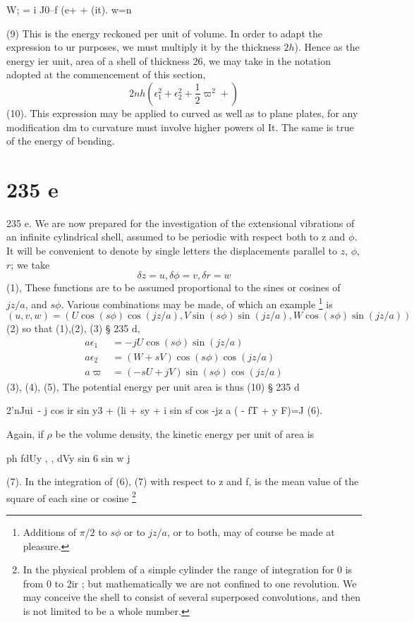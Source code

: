 W; = i J0--f (e+  + (it).  w=n

(9) This is the energy reckoned per unit of volume. In order to
adapt the expression to ur purposes, we must multiply it by the thickness
\(2h\)). Hence as the energy ier unit, area of a shell of thickness 26, we may
take in the notation adopted at the commencement of this section,
\[
 2nh \left( \epsilon_1^2 +\epsilon_2^2 + \frac{1}{2} \varpi^2 + \right)
\]
(10).  This expression may be applied to curved as well as to plane plates, for any
modification dm to curvature must involve higher powers ol It. The same is true
of the energy of bending.

\section{235 e}
235 e. We are now prepared for the investigation of the extensional vibrations
of an infinite cylindrical shell, assumed to be periodic with respect both to z
and \(\phi \).  It will be convenient to denote by single letters the
displacements parallel to \(z\), \(\phi \), \(r\); we take
\[\delta z=u , \delta \phi=v  , \delta r=w \]
(1), These functions are to be assumed proportional to the sines or cosines of
\(jz/a\), and \(s \phi \).  Various combinations may be made, of which an example
\footnote{Additions of \(\pi/2\) to \(s \phi \) or to \(jz/a\), or to both, may
of course be made at pleasure.} is
\[(u,v,w)=(U\cos(s \phi)\cos(jz/a), V \sin(s \phi )\sin(jz/a),
W\cos(s \phi )\sin(jz/a))\]
(2) so that (1),(2), (3) § 235 d,
\begin{align}
a \epsilon_1&=      -jU \cos(s \phi )  \sin(jz/a) \\
a \epsilon_2&= (W + sV) \cos(s \phi )  \cos(jz/a) \\
a \varpi    &= (-sU+jV) \sin(s \phi )  \cos(jz/a)
\end{align}
(3), (4), (5),
The potential energy per unit area is thus (10) § 235 d

 2'nJui~- j cos ir sin y3  + (li + sy + i sin sf cos -jz a ( -  fT + y F)=J (6).

Again, if \(\rho\) be the volume density, the kinetic energy per unit of area is

ph fdUy ,  , dVy sin 6 sin w j

(7).  In the integration of (6), (7) with respect to z and f,  is the
mean value of the square of each sine or cosine
\footnote{In the physical problem of a simple cylinder the range of integration
for 0 is from 0 to 2ir ; but mathematically we are not confined to one
revolution. We may conceive the shell to consist of several superposed
convolutions, and then  is not limited to be a whole number.}

